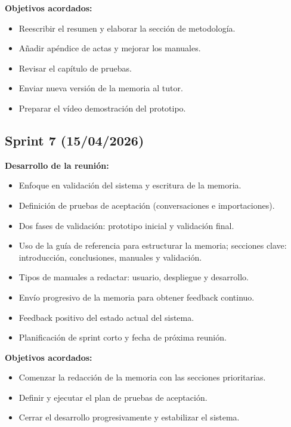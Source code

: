 \textbf{Objetivos acordados:}
\begin{itemize}
  \item Reescribir el resumen y elaborar la sección de metodología.
  \item Añadir apéndice de actas y mejorar los manuales.
  \item Revisar el capítulo de pruebas.
  \item Enviar nueva versión de la memoria al tutor.
  \item Preparar el vídeo demostración del prototipo.
\end{itemize}

\subsection*{Sprint 7 (15/04/2026)}

\textbf{Desarrollo de la reunión:}
\begin{itemize}
  \item Enfoque en validación del sistema y escritura de la memoria.
  \item Definición de pruebas de aceptación (conversaciones e importaciones).
  \item Dos fases de validación: prototipo inicial y validación final.
  \item Uso de la guía de referencia para estructurar la memoria; secciones clave: introducción, conclusiones, manuales y validación.
  \item Tipos de manuales a redactar: usuario, despliegue y desarrollo.
  \item Envío progresivo de la memoria para obtener feedback continuo.
  \item Feedback positivo del estado actual del sistema.
  \item Planificación de sprint corto y fecha de próxima reunión.
\end{itemize}

\textbf{Objetivos acordados:}
\begin{itemize}
  \item Comenzar la redacción de la memoria con las secciones prioritarias.
  \item Definir y ejecutar el plan de pruebas de aceptación.
  \item Cerrar el desarrollo progresivamente y estabilizar el sistema.
\end{itemize}

